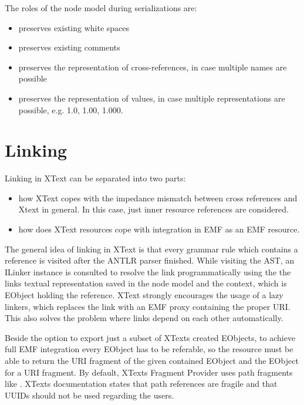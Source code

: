 The roles of the node model during serializations are:
\begin{itemize}
	\item preserves existing white spaces
	\item preserves existing comments
	\item preserves the representation of cross-references, in case multiple names are possible
	\item preserves the representation of values, in case multiple representations are possible, e.g. 1.0, 1.00, 1.000.
\end{itemize}

\section{Linking}
\label{sec:xtextarch:Linking}
Linking in XText can be separated into two parts:
\begin{itemize}
	\item how XText copes with the impedance mismatch between cross references and Xtext in general. In this case, just inner resource references are considered. 
	\item how does XText resources cope with integration in EMF as an EMF resource.
\end{itemize}
The general idea of linking in XText is that every grammar rule which contains a reference is visited after the ANTLR parser finished. While visiting the AST, an ILinker instance is consulted to resolve the link programmatically using the the links textual representation saved in the node model and the context, which is EObject holding the reference. XText strongly encourages the usage of a lazy linkers, which replaces the link with an EMF proxy containing the proper URI. This also solves the problem where links depend on each other automatically.

Beside the option to export just a subset of XTexts created EObjects, to achieve full EMF integration every EObject has to be referable, so the resource must be able to return the URI fragment of the given contained EObject and the EObject for a URI fragment. By default, XTexts Fragment Provider  uses path fragments like . XTexts documentation states that path references are fragile and that UUIDs should not be used regarding the users. 

